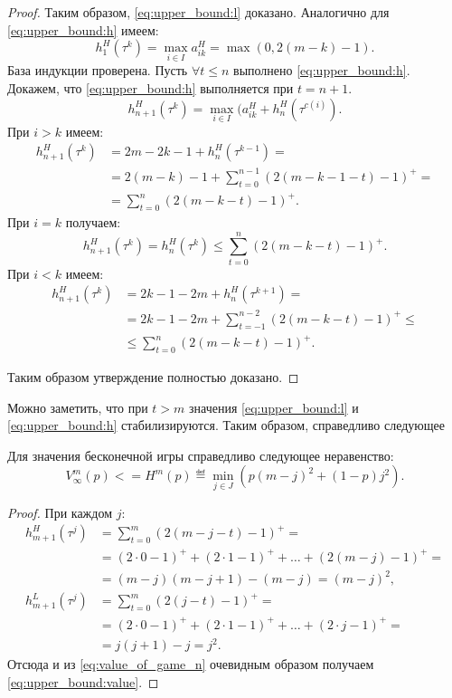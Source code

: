 \begin{proof}
Таким образом, \eqref{eq:upper_bound:l} доказано.
Аналогично для \eqref{eq:upper_bound:h} имеем:
\[
  h_1^H(\tau^k) = \max_{i \in I} a_{ik}^H = \max(0, 2(m - k) - 1).
\]
База индукции проверена.
Пусть $ \forall t \leq n $ выполнено \eqref{eq:upper_bound:h}. Докажем, что \eqref{eq:upper_bound:h} выполняется при $ t = n + 1 $.
\[
h_{n+1}^H(\tau^k) = \max_{i \in I}(a_{ik}^H + h_n^H(\tau^{c(i)}).
\]
При $ i > k $ имеем:
\begin{align*}
  h_{n+1}^H(\tau^k) 
  &= 2m - 2k - 1 + h_n^H(\tau^{k-1}) = \\
  &= 2(m-k)- 1 + \sum_{t = 0}^{n-1}(2(m-k-1-t)-1)^+ = \\
  &= \sum_{t = 0}^n (2(m-k-t) - 1)^+.
\end{align*}
При $ i = k $ получаем:
\[
  h_{n+1}^H(\tau^k) = h_n^H(\tau^k) \leq \sum_{t=0}^n(2(m-k-t)-1)^+.
\]
При $ i < k $ имеем:
\begin{align*}
  h_{n+1}^H(\tau^k) 
    &= 2k - 1 - 2m + h_n^H(\tau^{k+1}) = \\
    &= 2k - 1 - 2m + \sum_{t = -1}^{n-2} (2(m-k-t)-1)^+ \leq \\
    &\leq \sum_{t=0}^n(2(m-k-t)-1)^+.
\end{align*}

Таким образом утверждение полностью доказано.
\end{proof}

Можно заметить, что при $ t > m $ значения \eqref{eq:upper_bound:l} и \eqref{eq:upper_bound:h} стабилизируются. Таким образом, справедливо следующее

\begin{utver}
Для значения бесконечной игры справедливо следующее неравенство:
\begin{equation}
\label{eq:upper_bound:value}
V_\infty^m(p) 
<= 
H^m(p) \eqdef \min_{j \in J}
    (p(m-j)^2 + (1-p)j^2).
\end{equation}
\end{utver}
\begin{proof}
При каждом $ j $:
\begin{align*}
h_{m+1}^H(\tau^j) 
&= \sum_{t=0}^m (2(m-j-t)-1)^+ = \\
&= (2 \cdot 0 - 1)^+ + (2 \cdot 1 - 1)^+ + \ldots + (2(m-j) - 1)^+ = \\
&= (m-j)(m-j+1) - (m-j) = (m-j)^2,
\\
h_{m+1}^L(\tau^j)
&= \sum_{t=0}^m (2(j-t)-1)^+ = \\
&= (2 \cdot 0 - 1)^+ + (2 \cdot 1 - 1)^+ + \ldots + (2 \cdot j - 1)^+ = \\
&= j(j+1) - j = j^2.
\end{align*}
Отсюда и из \eqref{eq:value_of_game_n} очевидным образом получаем \eqref{eq:upper_bound:value}.
\end{proof}

